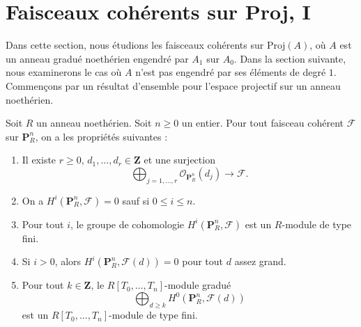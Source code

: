 \section{Faisceaux cohérents sur Proj, I}
\label{section-coherent-proj}

\noindent
Dans cette section, nous étudions les faisceaux cohérents sur $\text{Proj}(A)$,
où $A$ est un anneau gradué noethérien engendré par $A_1$ sur $A_0$.
Dans la section suivante, nous examinerons le cas où $A$ n'est pas engendré
par ses éléments de degré $1$. Commençons par un résultat d'ensemble
pour l'espace projectif sur un anneau noethérien.

\begin{lemma}
\label{lemma-coherent-projective}
Soit $R$ un anneau noethérien.
Soit $n \geq 0$ un entier.
Pour tout faisceau cohérent $\mathcal{F}$ sur $\mathbf{P}^n_R$,
on a les propriétés suivantes :
\begin{enumerate}
\item Il existe $r \geq 0$,
$d_1, \ldots, d_r \in \mathbf{Z}$ et une surjection
$$
\bigoplus\nolimits_{j = 1, \ldots, r}
\mathcal{O}_{\mathbf{P}^n_R}(d_j)
\longrightarrow
\mathcal{F}.
$$
\item On a $H^i(\mathbf{P}^n_R, \mathcal{F}) = 0$ sauf si
$0 \leq i \leq n$.
\item Pour tout $i$, le groupe de cohomologie $H^i(\mathbf{P}^n_R, \mathcal{F})$
est un $R$-module de type fini.
\item Si $i > 0$, alors
$H^i(\mathbf{P}^n_R, \mathcal{F}(d)) = 0$ pour tout $d$ assez grand.
\item Pour tout $k \in \mathbf{Z}$, le $R[T_0, \ldots, T_n]$-module gradué
$$
\bigoplus\nolimits_{d \geq k} H^0(\mathbf{P}^n_R, \mathcal{F}(d))
$$
est un $R[T_0, \ldots, T_n]$-module de type fini.
\end{enumerate}
\end{lemma}

